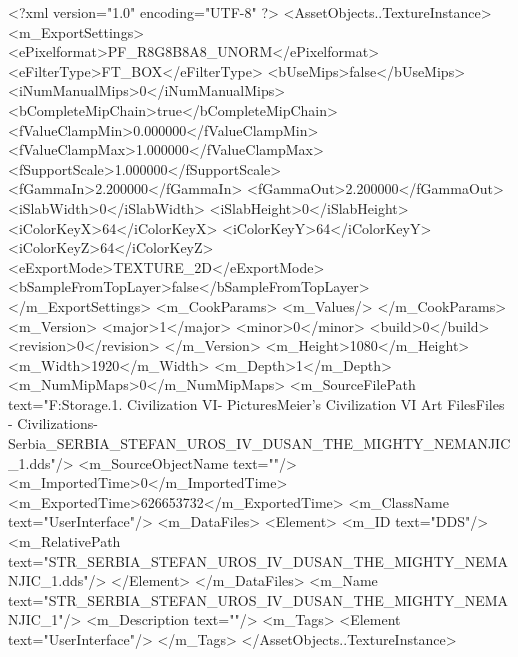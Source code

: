 <?xml version="1.0" encoding="UTF-8" ?>
<AssetObjects..TextureInstance>
	<m_ExportSettings>
		<ePixelformat>PF_R8G8B8A8_UNORM</ePixelformat>
		<eFilterType>FT_BOX</eFilterType>
		<bUseMips>false</bUseMips>
		<iNumManualMips>0</iNumManualMips>
		<bCompleteMipChain>true</bCompleteMipChain>
		<fValueClampMin>0.000000</fValueClampMin>
		<fValueClampMax>1.000000</fValueClampMax>
		<fSupportScale>1.000000</fSupportScale>
		<fGammaIn>2.200000</fGammaIn>
		<fGammaOut>2.200000</fGammaOut>
		<iSlabWidth>0</iSlabWidth>
		<iSlabHeight>0</iSlabHeight>
		<iColorKeyX>64</iColorKeyX>
		<iColorKeyY>64</iColorKeyY>
		<iColorKeyZ>64</iColorKeyZ>
		<eExportMode>TEXTURE_2D</eExportMode>
		<bSampleFromTopLayer>false</bSampleFromTopLayer>
	</m_ExportSettings>
	<m_CookParams>
		<m_Values/>
	</m_CookParams>
	<m_Version>
		<major>1</major>
		<minor>0</minor>
		<build>0</build>
		<revision>0</revision>
	</m_Version>
	<m_Height>1080</m_Height>
	<m_Width>1920</m_Width>
	<m_Depth>1</m_Depth>
	<m_NumMipMaps>0</m_NumMipMaps>
	<m_SourceFilePath text="F:\Mod Storage\2.1. Civilization VI\Mods\Archive - Pictures\Sid Meier's Civilization VI Art Files\Art Files - Civilizations\Civilization - Serbia\STR_SERBIA_STEFAN_UROS_IV_DUSAN_THE_MIGHTY_NEMANJIC_1.dds"/>
	<m_SourceObjectName text=""/>
	<m_ImportedTime>0</m_ImportedTime>
	<m_ExportedTime>626653732</m_ExportedTime>
	<m_ClassName text="UserInterface"/>
	<m_DataFiles>
		<Element>
			<m_ID text="DDS"/>
			<m_RelativePath text="STR_SERBIA_STEFAN_UROS_IV_DUSAN_THE_MIGHTY_NEMANJIC_1.dds"/>
		</Element>
	</m_DataFiles>
	<m_Name text="STR_SERBIA_STEFAN_UROS_IV_DUSAN_THE_MIGHTY_NEMANJIC_1"/>
	<m_Description text=""/>
	<m_Tags>
		<Element text="UserInterface"/>
	</m_Tags>
</AssetObjects..TextureInstance>

